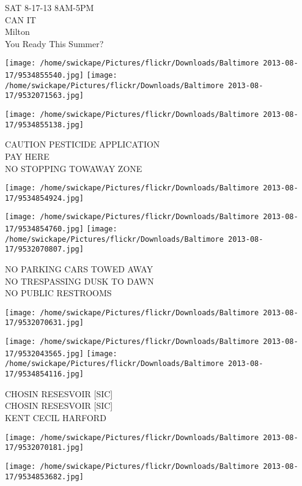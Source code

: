 \documentclass[10pt,letterpaper]{article}
\begin{document}
SAT 8{-}17{-}13 8AM{-}5PM\\
CAN IT\\
Milton\\
You Ready This Summer?\\
\pagebreak

\texttt{[image: /home/swickape/Pictures/flickr/Downloads/Baltimore 2013-08-17/9534855540.jpg]}
\texttt{[image: /home/swickape/Pictures/flickr/Downloads/Baltimore 2013-08-17/9532071563.jpg]}

\texttt{[image: /home/swickape/Pictures/flickr/Downloads/Baltimore 2013-08-17/9534855138.jpg]}

CAUTION PESTICIDE APPLICATION\\
PAY HERE\\
NO STOPPING TOWAWAY ZONE\\
\pagebreak

\texttt{[image: /home/swickape/Pictures/flickr/Downloads/Baltimore 2013-08-17/9534854924.jpg]}

\vspace{0.25in}
\texttt{[image: /home/swickape/Pictures/flickr/Downloads/Baltimore 2013-08-17/9534854760.jpg]}
\texttt{[image: /home/swickape/Pictures/flickr/Downloads/Baltimore 2013-08-17/9532070807.jpg]}

NO PARKING CARS TOWED AWAY\\
NO TRESPASSING DUSK TO DAWN\\
NO PUBLIC RESTROOMS\\
\pagebreak

\texttt{[image: /home/swickape/Pictures/flickr/Downloads/Baltimore 2013-08-17/9532070631.jpg]}

\vspace{0.25in}
\texttt{[image: /home/swickape/Pictures/flickr/Downloads/Baltimore 2013-08-17/9532043565.jpg]}
\texttt{[image: /home/swickape/Pictures/flickr/Downloads/Baltimore 2013-08-17/9534854116.jpg]}

CHOSIN RESESVOIR {[}SIC{]}\\
CHOSIN RESESVOIR {[}SIC{]}\\
KENT CECIL HARFORD\\
\pagebreak

\texttt{[image: /home/swickape/Pictures/flickr/Downloads/Baltimore 2013-08-17/9532070181.jpg]}

\vspace{0.25in}
\texttt{[image: /home/swickape/Pictures/flickr/Downloads/Baltimore 2013-08-17/9534853682.jpg]}
\end{document}
